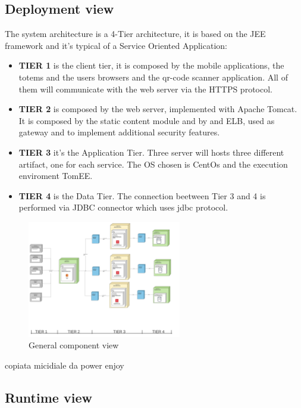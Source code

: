 \subsection{Deployment view}
\label{subsect:deploymentview}
The system architecture is a 4-Tier architecture, it is based on the JEE framework and it's typical of a Service Oriented Application:
\begin{itemize}
    \item \textbf{TIER 1} is the client tier, it is composed by the mobile applications, the totems and the users browsers and the qr-code scanner application. All of them will communicate with the web server via the HTTPS protocol.
    \item \textbf{TIER 2} is composed by the web server, implemented with Apache Tomcat. It is composed by the static content module and by and ELB, used as gateway and to implement additional security features.
    \item \textbf{TIER 3} it's the Application Tier. Three server will hosts three different artifact, one for each service. The OS chosen is CentOs and the execution enviroment TomEE.
    \item \textbf{TIER 4} is the Data Tier. The connection beetween Tier 3 and 4 is performed via JDBC connector which uses jdbc protocol.
\end{itemize}
\begin{figure}[h!]
    \centering
    \includegraphics[width=0.6\textwidth]{Images/Deployement View.png}
    \caption{\label{fig:Deployement View}{General component view}}
\end{figure}

copiata micidiale da power enjoy

\subsection{Runtime view}
\label{subsect:runtimeview}

